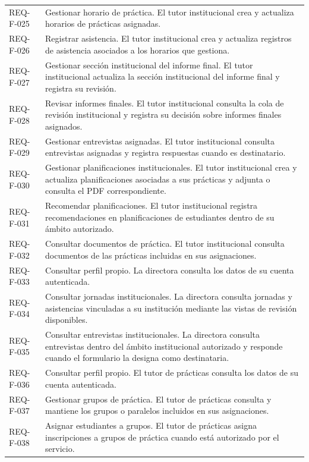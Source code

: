 \documentclass[11pt,a4paper]{article}
\begin{document}
{\begin{longtable}{@{}P{2.5cm}P{12.6cm}@{}}
REQ-F-025 & Gestionar horario de práctica. El tutor institucional crea y actualiza horarios de prácticas asignadas.\\
REQ-F-026 & Registrar asistencia. El tutor institucional crea y actualiza registros de asistencia asociados a los horarios que gestiona.\\
REQ-F-027 & Gestionar sección institucional del informe final. El tutor institucional actualiza la sección institucional del informe final y registra su revisión.\\
REQ-F-028 & Revisar informes finales. El tutor institucional consulta la cola de revisión institucional y registra su decisión sobre informes finales asignados.\\
REQ-F-029 & Gestionar entrevistas asignadas. El tutor institucional consulta entrevistas asignadas y registra respuestas cuando es destinatario.\\
REQ-F-030 & Gestionar planificaciones institucionales. El tutor institucional crea y actualiza planificaciones asociadas a sus prácticas y adjunta o consulta el PDF correspondiente.\\
REQ-F-031 & Recomendar planificaciones. El tutor institucional registra recomendaciones en planificaciones de estudiantes dentro de su ámbito autorizado.\\
REQ-F-032 & Consultar documentos de práctica. El tutor institucional consulta documentos de las prácticas incluidas en sus asignaciones.\\
REQ-F-033 & Consultar perfil propio. La directora consulta los datos de su cuenta autenticada.\\
REQ-F-034 & Consultar jornadas institucionales. La directora consulta jornadas y asistencias vinculadas a su institución mediante las vistas de revisión disponibles.\\
REQ-F-035 & Consultar entrevistas institucionales. La directora consulta entrevistas dentro del ámbito institucional autorizado y responde cuando el formulario la designa como destinataria.\\
REQ-F-036 & Consultar perfil propio. El tutor de prácticas consulta los datos de su cuenta autenticada.\\
REQ-F-037 & Gestionar grupos de práctica. El tutor de prácticas consulta y mantiene los grupos o paralelos incluidos en sus asignaciones.\\
REQ-F-038 & Asignar estudiantes a grupos. El tutor de prácticas asigna inscripciones a grupos de práctica cuando está autorizado por el servicio.\\

\end{longtable}}
\end{document}
